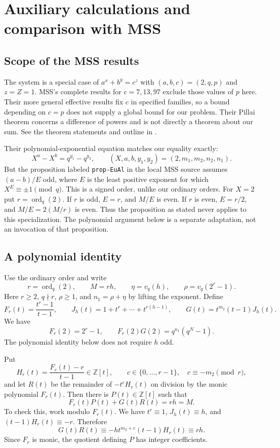 \documentclass[11pt]{article}
\begin{document}
\clearpage
\section{Auxiliary calculations and comparison with MSS}
\label{sec:auxiliary}

\subsection{Scope of the MSS results}

The system is a special case of $a^x+b^y=c^z$ with
$(a,b,c)=(2,q,p)$ and $z=Z=1$. MSS's complete results for
$c=7,13,97$ exclude those values of $p$ here. Their more general effective
results fix $c$ in specified families, so a bound depending on $c=p$
does not supply a global bound for our problem. Their Pillai theorem
concerns a difference of powers and is not directly a theorem about
our sum. See the theorem statements and outline in \cite{MSS}.

Their polynomial-exponential equation matches our equality exactly:
\[
X^a-X^b=q^{y_1}-q^{y_2},\qquad
(X,a,b,y_1,y_2)=(2,m_1,m_2,n_2,n_1).
\]
But the proposition labeled \texttt{prop-EuAl} in the local MSS source
assumes $(a-b)/E$ odd, where $E$ is the least positive exponent for which
$X^E\equiv\pm1\pmod q$. This is a signed order, unlike our ordinary orders.
For $X=2$ put $r=\operatorname{ord}_q(2)$. If $r$ is odd, $E=r$,
and $M/E$ is even. If $r$ is even, $E=r/2$, and $M/E=2(M/r)$ is even.
Thus the proposition as stated never applies to this specialization.
The polynomial argument below is a separate adaptation, not an invocation
of that proposition.

\subsection{A polynomial identity}
\label{sec:polynomial}

Use the ordinary order and write
\[
r=\operatorname{ord}_q(2),\qquad M=rh,\qquad
\eta=v_q(h),\qquad \rho=v_q(2^r-1).
\]
Here $r\geq2$, $q\nmid r$, $\rho\geq1$, and
$n_1=\rho+\eta$ by lifting the exponent.
Define
\[
F_r(t)=\frac{t^r-1}{t-1},\qquad
J_h(t)=1+t^r+\cdots+t^{r(h-1)},\qquad
G(t)=t^{m_2}(t-1)J_h(t).
\]
We have
\[
F_r(2)=2^r-1,\qquad
F_r(2)G(2)=q^{n_1}(q^N-1).
\]
The polynomial identity below does not require $h$ odd.

Put
\[
H_r(t)=\frac{F_r(t)-r}{t-1}\in\mathbb Z[t],
\qquad c\in\{0,\ldots,r-1\},\quad c\equiv-m_2\pmod r,
\]
and let $R(t)$ be the remainder of $-t^cH_r(t)$ on division by the
monic polynomial $F_r(t)$. Then there is $P(t)\in\mathbb Z[t]$ such that
\begin{equation}\label{eq:adapted-bezout}
\boxed{F_r(t)P(t)+G(t)R(t)=rh=M.}
\end{equation}
To check this, work modulo $F_r(t)$. We have $t^r\equiv1$,
$J_h(t)\equiv h$, and $(t-1)H_r(t)\equiv-r$. Therefore
\[
G(t)R(t)\equiv
-h t^{m_2+c}(t-1)H_r(t)\equiv rh.
\]
Since $F_r$ is monic, the quotient defining $P$ has integer coefficients.
\end{document}

